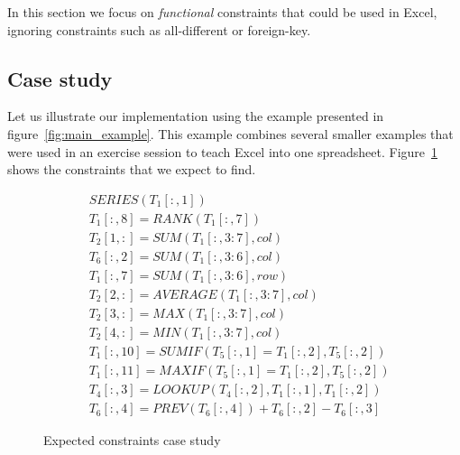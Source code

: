 \documentclass{ecai}
\newcommand{\range}[3]{\ensuremath{#1[#2,#3]}}
\newcommand{\rangeto}[2]{#1{:}#2}
\newcommand{\rangeall}{:}
\begin{document}
In this section we focus on \textit{functional} constraints that could be used in Excel, ignoring constraints such as all-different or foreign-key.

\subsection{Case study}
Let us illustrate our implementation using the example presented in figure~\ref{fig:main_example}.
This example combines several smaller examples that were used in an exercise session to teach Excel into one spreadsheet.
Figure~\ref{fig:sol_example} shows the constraints that we expect to find.

\begin{figure}
  \label{fig:sol_example}
  {\small
    \begin{align*}
      & SERIES(\range{T_{1}}{\rangeall}{1}) \\
      & \range{T_{1}}{\rangeall}{8} = RANK(\range{T_{1}}{\rangeall}{7}) \\
      & \range{T_{2}}{1}{\rangeall} = SUM(\range{T_{1}}{\rangeall}{\rangeto{3}{7}}, col) \\
      & \range{T_{6}}{\rangeall}{2} = SUM(\range{T_{1}}{\rangeall}{\rangeto{3}{6}}, col) \\
      & \range{T_{1}}{\rangeall}{7} = SUM(\range{T_{1}}{\rangeall}{\rangeto{3}{6}}, row) \\
      & \range{T_{2}}{2}{\rangeall} = AVERAGE(\range{T_{1}}{\rangeall}{\rangeto{3}{7}}, col) \\
      & \range{T_{2}}{3}{\rangeall} = MAX(\range{T_{1}}{\rangeall}{\rangeto{3}{7}}, col) \\
      & \range{T_{2}}{4}{\rangeall} = MIN(\range{T_{1}}{\rangeall}{\rangeto{3}{7}}, col) \\
      & \range{T_{1}}{\rangeall}{10} = SUMIF(\range{T_{5}}{\rangeall}{1}=\range{T_{1}}{\rangeall}{2}, \range{T_{5}}{\rangeall}{2}) \\
      & \range{T_{1}}{\rangeall}{11} = MAXIF(\range{T_{5}}{\rangeall}{1}=\range{T_{1}}{\rangeall}{2}, \range{T_{5}}{\rangeall}{2}) \\
      & \range{T_{4}}{\rangeall}{3} = LOOKUP(\range{T_{4}}{\rangeall}{2}, \range{T_{1}}{\rangeall}{1}, \range{T_{1}}{\rangeall}{2}) \\
      & \range{T_{6}}{\rangeall}{4} = PREV(\range{T_{6}}{\rangeall}{4}) + \range{T_{6}}{\rangeall}{2} - \range{T_{6}}{\rangeall}{3}
    \end{align*}
  }
  \caption{Expected constraints case study}
\end{figure}
\end{document}
